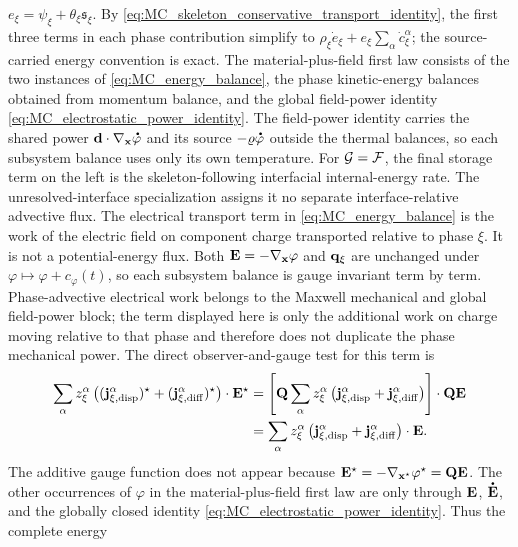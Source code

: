 \(e_\xi=\psi_\xi+\theta_\xi\mathfrak{s}_\xi\).  By
\eqref{eq:MC_skeleton_conservative_transport_identity}, the first three terms
in each phase contribution simplify to
\(\rho_\xi\dot e_\xi+e_\xi\sum_\alpha\dot c_\xi^\alpha\); the source-carried
energy convention is exact.  The material-plus-field first law consists of the
two instances of \eqref{eq:MC_energy_balance}, the phase kinetic-energy
balances obtained from momentum balance, and the global field-power identity
\eqref{eq:MC_electrostatic_power_identity}.  The field-power identity carries
the shared power \(\mbf d\cdot\nabla_{\mbf x}\phasedot\varphi\) and its source
\(-\varrho\phasedot\varphi\) outside the thermal balances, so each subsystem
balance uses only its own temperature.
For \(\mathcal{G}=\mathcal{F}\), the final storage term on the left is the
skeleton-following interfacial internal-energy rate.  The unresolved-interface
specialization assigns it no separate interface-relative advective flux.
The electrical transport term in \eqref{eq:MC_energy_balance} is the work of
the electric field on component charge transported relative to phase
\(\xi\).  It is not a potential-energy flux.  Both
\(\mathbf{E}=-\nabla_{\mathbf{x}}\varphi\) and \(\mathbf{q}_\xi\) are unchanged under
\(\varphi\mapsto\varphi+c_\varphi(t)\), so each subsystem balance is gauge
invariant term by term.  Phase-advective electrical work belongs to the
Maxwell mechanical and global field-power block; the term displayed here is
only the additional work on charge moving relative to that phase and therefore
does not duplicate the phase mechanical power.
The direct observer-and-gauge test for this term is
%
\begin{align}
	\sum_\alpha z_\xi^\alpha
	\left(
		(\mathbf{j}_{\xi,{\rm disp}}^\alpha)^\star
		+
		(\mathbf{j}_{\xi,{\rm diff}}^\alpha)^\star
	\right)\cdot\mathbf{E}^\star
	&=
	\left[
		\mathbf{Q}
		\sum_\alpha z_\xi^\alpha
		\left(
			\mathbf{j}_{\xi,{\rm disp}}^\alpha
			+
			\mathbf{j}_{\xi,{\rm diff}}^\alpha
		\right)
	\right]\cdot\mathbf{Q}\mathbf{E}
	\notag \\
	&=
	\sum_\alpha z_\xi^\alpha
	\left(
		\mathbf{j}_{\xi,{\rm disp}}^\alpha
		+
		\mathbf{j}_{\xi,{\rm diff}}^\alpha
	\right)\cdot\mathbf{E} .
	\label{eq:MC_relative_current_work_gauge_objectivity}
\end{align}
%
The additive gauge function does not appear because
\(\mathbf{E}^\star=-\nabla_{\mathbf{x}^\star}\varphi^\star=\mathbf{Q}\mathbf{E}\).
The other occurrences of \(\varphi\) in the material-plus-field first law are
only through \(\mathbf{E}\), \(\phasedot{\mbf E}\), and the globally closed identity
\eqref{eq:MC_electrostatic_power_identity}.  Thus the complete energy
